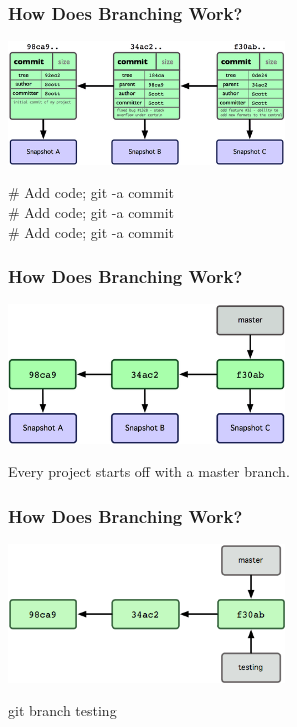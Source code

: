 \begin{frame}
\frametitle{\large How Does Branching Work?}
\begin{center}
\includegraphics[width=0.55\textwidth]{img/branching_images/fig2.png}
\end{center}
\vspace{2mm}
\begin{center}
\# Add code; git -a commit \\
\# Add code; git -a commit \\
\# Add code; git -a commit
\end{center}
\end{frame}
\note{}

\begin{frame}
\frametitle{\large How Does Branching Work?}
\begin{center}
\includegraphics[width=0.55\textwidth]{img/branching_images/fig3.png}
\end{center}
\vspace{2mm}
\begin{center}
Every project starts off with a master branch.
\end{center}
\end{frame}
\note{}

\begin{frame}
\frametitle{\large How Does Branching Work?}
\begin{center}
\includegraphics[width=0.55\textwidth]{img/branching_images/fig4.png}
\end{center}
\vspace{2mm}
\begin{center}
git branch testing
\end{center}
\end{frame}
\note{}

